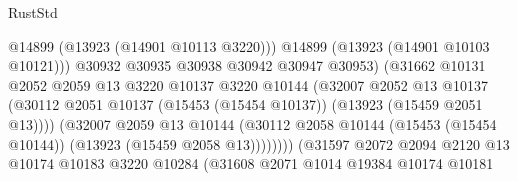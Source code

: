 \begin{lexlean}{RustStd}
\begin{coremodule}
                                              @14899
                                              (@13923 (@14901 @10113 @3220)))
                                            @14899
                                            (@13923 (@14901 @10103 @10121)))
                                          @30932
                                          @30935
                                          @30938
                                          @30942
                                          @30947
                                          @30953)
                                        (@31662
                                          @10131
                                          @2052
                                          @2059
                                          @13
                                          @3220
                                          @10137
                                          @3220
                                          @10144
                                          (@32007
                                            @2052
                                            @13
                                            @10137
                                            (@30112
                                              @2051
                                              @10137
                                              (@15453 (@15454 @10137))
                                              (@13923 (@15459 @2051 @13))))
                                          (@32007
                                            @2059
                                            @13
                                            @10144
                                            (@30112
                                              @2058
                                              @10144
                                              (@15453 (@15454 @10144))
                                              (@13923 (@15459 @2058 @13))))))))
                                  (@31597
                                    @2072
                                    @2094
                                    @2120
                                    @13
                                    @10174
                                    @10183
                                    @3220
                                    @10284
                                    (@31608
                                      @2071
                                      @1014
                                      @19384
                                      @10174
                                      @10181

\end{coremodule}
\end{lexlean}
